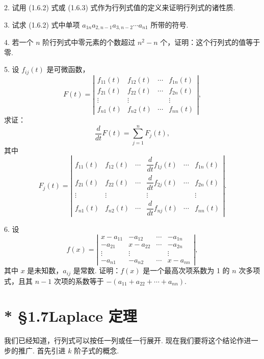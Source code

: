 \documentclass[UTF8,12pt,a4paper,fontset=fandol]{ctexart}
\begin{document}
2. 试用 (1.6.2) 式或 (1.6.3) 式作为行列式值的定义来证明行列式的诸性质.

3. 试求 (1.6.2) 式中单项 $a_{1n}a_{2,n-1}a_{3,n-2}\cdots a_{n1}$ 所带的符号.

4. 若一个 $n$ 阶行列式中零元素的个数超过 $n^2-n$ 个，证明：这个行列式的值等于零.

5. 设 $f_{ij}(t)$ 是可微函数，
\[
F(t)=
\left|\begin{array}{cccc}
f_{11}(t) & f_{12}(t) & \cdots & f_{1n}(t)\\
f_{21}(t) & f_{22}(t) & \cdots & f_{2n}(t)\\
\vdots & \vdots & & \vdots\\
f_{n1}(t) & f_{n2}(t) & \cdots & f_{nn}(t)
\end{array}\right|,
\]
求证：
\[
\frac{d}{dt}F(t)=\sum_{j=1}^n F_j(t),
\]
其中
\[
F_j(t)=
\left|\begin{array}{ccccccc}
f_{11}(t) & f_{12}(t) & \cdots & \dfrac{d}{dt}f_{1j}(t) & \cdots & f_{1n}(t)\\
f_{21}(t) & f_{22}(t) & \cdots & \dfrac{d}{dt}f_{2j}(t) & \cdots & f_{2n}(t)\\
\vdots & \vdots & & \vdots & & \vdots\\
f_{n1}(t) & f_{n2}(t) & \cdots & \dfrac{d}{dt}f_{nj}(t) & \cdots & f_{nn}(t)
\end{array}\right|.
\]

6. 设
\[
f(x)=
\left|\begin{array}{cccc}
x-a_{11} & -a_{12} & \cdots & -a_{1n}\\
-a_{21} & x-a_{22} & \cdots & -a_{2n}\\
\vdots & \vdots & & \vdots\\
-a_{n1} & -a_{n2} & \cdots & x-a_{nn}
\end{array}\right|,
\]
其中 $x$ 是未知数，$a_{ij}$ 是常数. 证明：$f(x)$ 是一个最高次项系数为 1 的 $n$ 次多项式，且其 $n-1$ 次项的系数等于 $-(a_{11}+a_{22}+\cdots+a_{nn})$.

\section*{* §1.7\quad Laplace 定理}

我们已经知道，行列式可以按任一列或任一行展开. 现在我们要将这个结论作进一步的推广. 首先引进 $k$ 阶子式的概念.
\end{document}
